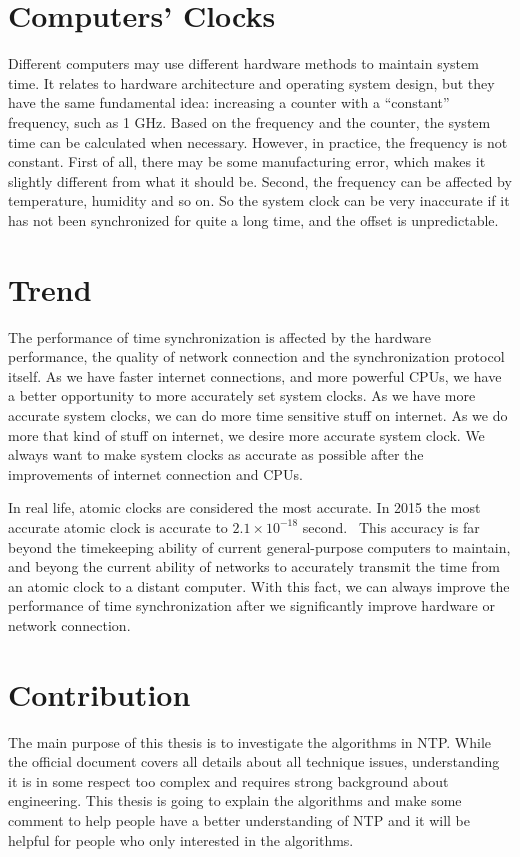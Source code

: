 \section{Computers' Clocks}
\label{sec:computers_clocks}
Different computers may use different hardware methods to maintain system time.
It relates to hardware architecture and operating system design, but they have
the same fundamental idea: increasing a counter with a ``constant'' frequency,
such as 1 GHz.  Based on the frequency and the counter, the system time can be
calculated when necessary. However, in practice, the frequency is not constant.
First of all, there may be some manufacturing error, which makes it slightly
different from what it should be. Second, the frequency can be affected by
temperature, humidity and so on. So the system clock can be very inaccurate if
it has not been synchronized for quite a long time, and the offset is
unpredictable.

\section{Trend}
\label{sec:trend}
The performance of time synchronization is affected by the hardware
performance, the quality of network connection and the synchronization protocol
itself. 
As we have faster internet connections, and more powerful CPUs, we have a
better opportunity to more accurately set system clocks. As we have more
accurate system clocks, we can do more time sensitive stuff on internet. As we
do more that kind of stuff on internet, we desire more accurate system clock.
We always want to make system clocks as accurate as possible after the
improvements of internet connection and CPUs. 

In real life, atomic clocks are considered the most accurate. In 2015 the most
accurate atomic clock is accurate to $2.1\times 10^{-18}$
second.~\cite{atomic_clock} 
This accuracy is far beyond the timekeeping ability of current general-purpose
computers to maintain, and beyong the current ability of networks to accurately
transmit the time from an atomic clock to a distant computer. With this fact,
we can always improve the performance of time synchronization after we
significantly improve hardware or network connection.

\section{Contribution}
\label{sec:contribution}
The main purpose of this thesis is to investigate the algorithms in NTP\null.
While the official document covers all details about all technique issues,
understanding it is in some respect too complex and requires strong background
about engineering. This thesis is going to explain the algorithms and make
some comment to help people have a better understanding of NTP and it will be
helpful for people who only interested in the algorithms.

